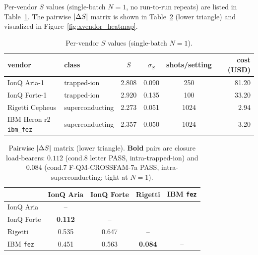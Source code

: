 Per-vendor $S$ values (single-batch $N = 1$, no run-to-run repeats)
are listed in Table~\ref{tab:vendor_S}. The pairwise $\lvert\Delta S\rvert$ matrix is
shown in Table~\ref{tab:xvendor_matrix} (lower triangle) and
visualized in Figure~\ref{fig:xvendor_heatmap}.

\begin{table}[htbp]
\centering
\caption{Per-vendor $S$ values (single-batch $N=1$).}
\label{tab:vendor_S}
\footnotesize
\begin{tabular}{l l c c c r}
\toprule
vendor & class & $S$ & $\sigma_{S}$ & shots/setting & cost (USD) \\
\midrule
IonQ Aria-1     & trapped-ion & 2.808 & 0.090 & 250  & 81.20 \\
IonQ Forte-1    & trapped-ion & 2.920 & 0.135 & 100  & 33.20 \\
Rigetti Cepheus & superconducting & 2.273 & 0.051 & 1024 & 2.94 \\
IBM Heron r2 \texttt{ibm\_fez} & superconducting & 2.357 & 0.050 & 1024 & 3.20 \\
\bottomrule
\end{tabular}
\end{table}

\begin{table}[htbp]
\centering
\caption{Pairwise $\lvert\Delta S\rvert$ matrix (lower triangle). \textbf{Bold} pairs
are closure load-bearers: $0.112$ (cond.8 letter PASS,
intra-trapped-ion) and $0.084$ (cond.7 F-QM-CROSSFAM-7a PASS,
intra-superconducting; tight at $N=1$).}
\label{tab:xvendor_matrix}
\footnotesize
\begin{tabular}{l c c c c}
\toprule
                & IonQ Aria & IonQ Forte & Rigetti & IBM \texttt{fez} \\
\midrule
IonQ Aria       & --        &            &           &    \\
IonQ Forte      & \textbf{0.112} & --     &           &    \\
Rigetti         & 0.535     & 0.647      & --        &    \\
IBM \texttt{fez} & 0.451    & 0.563      & \textbf{0.084} & -- \\
\bottomrule
\end{tabular}
\end{table}

